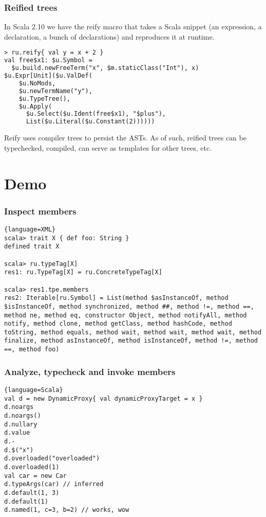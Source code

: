 \documentclass[hyperref={bookmarks=false}]{beamer}
\begin{document}
\begin{frame}[fragile]
\frametitle{Reified trees}

In Scala 2.10 we have the reify macro that takes a Scala snippet (an expression, a declaration,
a bunch of declarations) and reproduces it at runtime.

\begin{lstlisting}[language=XML]
> ru.reify{ val y = x + 2 }
val free$x1: $u.Symbol =
  $u.build.newFreeTerm("x", $m.staticClass("Int"), x)
$u.Expr[Unit]($u.ValDef(
    $u.NoMods,
    $u.newTermName("y"),
    $u.TypeTree(),
    $u.Apply(
      $u.Select($u.Ident(free$x1), "$plus"),
      List($u.Literal($u.Constant(2))))))
\end{lstlisting}

Reify uses compiler trees to persist the ASTs. As of such, reified trees can be typechecked,
compiled, can serve as templates for other trees, etc.

\end{frame}

\section{Demo}

\begin{frame}[fragile]
\frametitle{Inspect members}

\begin{lstlisting}{language=XML}
scala> trait X { def foo: String }
defined trait X

scala> ru.typeTag[X]
res1: ru.TypeTag[X] = ru.ConcreteTypeTag[X]

scala> res1.tpe.members
res2: Iterable[ru.Symbol] = List(method $asInstanceOf, method $isInstanceOf, method synchronized, method ##, method !=, method ==, method ne, method eq, constructor Object, method notifyAll, method notify, method clone, method getClass, method hashCode, method toString, method equals, method wait, method wait, method wait, method finalize, method asInstanceOf, method isInstanceOf, method !=, method ==, method foo)
\end{lstlisting}
\end{frame}

\begin{frame}[fragile]
\frametitle{Analyze, typecheck and invoke members}

\begin{lstlisting}{language=Scala}
val d = new DynamicProxy{ val dynamicProxyTarget = x }
d.noargs
d.noargs()
d.nullary
d.value
d.-
d.$("x")
d.overloaded("overloaded")
d.overloaded(1)
val car = new Car
d.typeArgs(car) // inferred
d.default(1, 3)
d.default(1)
d.named(1, c=3, b=2) // works, wow
\end{lstlisting}

\end{frame}
\end{document}
